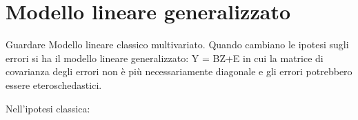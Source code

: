 \documentclass[a4page, 11pt]{article}
\begin{document}
\section{Modello lineare generalizzato}

Guardare Modello lineare classico multivariato.
\newline
Quando cambiano le ipotesi sugli errori si ha il modello lineare generalizzato: Y = BZ+E in cui la matrice di covarianza degli errori non è più necessariamente diagonale e gli errori potrebbero essere eteroschedastici. 
\newline
\newline
\newline
\newline
\newline

Nell’ipotesi classica:
\end{document}
